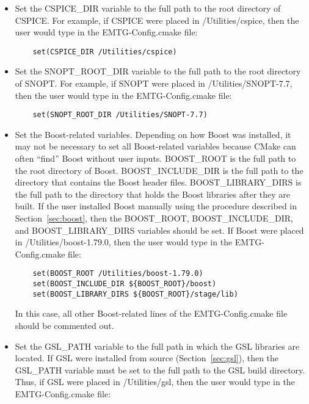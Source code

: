 \begin{itemize}
	\item Set the CSPICE\_DIR variable to the full path to the root directory of CSPICE. For example, if CSPICE were placed in /Utilities/cspice, then the user would type in the EMTG-Config.cmake file:
	
	\begin{verbatim}
	set(CSPICE_DIR /Utilities/cspice)
	\end{verbatim}
	
	\item Set the SNOPT\_ROOT\_DIR variable to the full path to the root directory of \ac{SNOPT}. For example, if \ac{SNOPT} were placed in /Utilities/SNOPT-7.7, then the user would type in the EMTG-Config.cmake file:
	
	\begin{verbatim}
	set(SNOPT_ROOT_DIR /Utilities/SNOPT-7.7)
	\end{verbatim}
	
	\item Set the Boost-related variables. Depending on how Boost was installed, it may not be necessary to set all Boost-related variables because CMake can often ``find'' Boost without user inputs. BOOST\_ROOT is the full path to the root directory of Boost. BOOST\_INCLUDE\_DIR is the full path to the directory that contains the Boost header files. BOOST\_LIBRARY\_DIRS is the full path to the directory that holds the Boost libraries after they are built. If the user installed Boost manually using the procedure described in Section~\ref{sec:boost}, then the BOOST\_ROOT, BOOST\_INCLUDE\_DIR, and BOOST\_LIBRARY\_DIRS variables should be set. If Boost were placed in /Utilities/boost-1.79.0, then the user would type in the EMTG-Config.cmake file:
	
	\begin{verbatim}
	set(BOOST_ROOT /Utilities/boost-1.79.0)
	set(BOOST_INCLUDE_DIR ${BOOST_ROOT}/boost)
	set(BOOST_LIBRARY_DIRS ${BOOST_ROOT}/stage/lib)
	\end{verbatim}
	
	In this case, all other Boost-related lines of the EMTG-Config.cmake file should be commented out.
	
	\item Set the GSL\_PATH variable to the full path in which the \ac{GSL} libraries are located. If \ac{GSL} were installed from source (Section~\ref{sec:gsl}), then the GSL\_PATH variable must be set to the full path to the \ac{GSL} build directory. Thus, if \ac{GSL} were placed in /Utilities/gsl, then the user would type in the EMTG-Config.cmake file:
	

\end{itemize}
